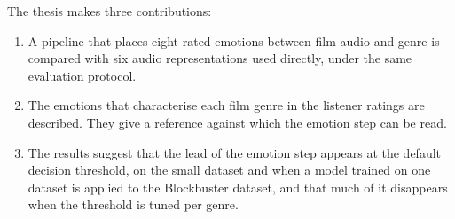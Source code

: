 
The thesis makes three contributions:
\begin{enumerate}
  \item A pipeline that places eight rated emotions between film audio and genre is compared with six audio representations used directly, under the same evaluation protocol.
  \item The emotions that characterise each film genre in the listener ratings are described. They give a reference against which the emotion step can be read.
  \item The results suggest that the lead of the emotion step appears at the default decision threshold, on the small dataset and when a model trained on one dataset is applied to the Blockbuster dataset, and that much of it disappears when the threshold is tuned per genre.
\end{enumerate}
